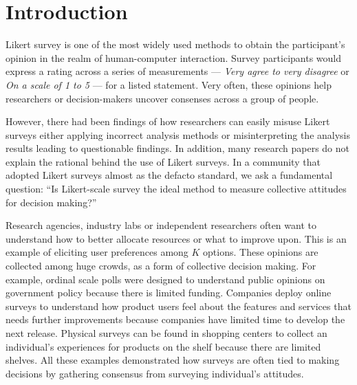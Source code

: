 \section{Introduction}
Likert survey 
is one of the most widely used methods
to obtain the participant's opinion
in the realm of human-computer interaction.
Survey participants would express
a rating across a series of measurements ---
\textit{Very agree to very disagree} or
\textit{On a scale of 1 to 5} ---
for a listed statement.
Very often, 
these opinions help
researchers or decision-makers
uncover consenses 
across a group of people.

However, there had been findings of
how researchers can 
easily misuse Likert surveys
either applying incorrect analysis methods 
\cite{bishop2015use}
or misinterpreting the analysis results
\cite{jamieson2004likert, pell2005use}
leading to questionable findings.
In addition, 
many research papers
do not explain the rational
behind the use of 
Likert surveys.
In a community that adopted Likert surveys
almost as the defacto standard,
we ask a fundamental question: 
``Is Likert-scale survey the ideal method
to measure collective attitudes for decision making?''

Research agencies, industry labs or independent researchers
often want to understand how to better allocate resources
or what to improve upon.
This is an example of eliciting user preferences 
among $K$ options.
These opinions are collected among huge crowds,
as a form of collective decision making.
For example, 
ordinal scale polls were designed
to understand public opinions
on government policy \cite{pew}
because there is limited funding.
Companies deploy online surveys 
to understand how product users 
feel about the features and services
that needs further improvements
because companies have limited time 
to develop the next release.
Physical surveys can be found 
in shopping centers 
to collect an individual's experiences
for products on the shelf
because there are limited shelves.
All these examples demonstrated
how surveys are often tied to 
making decisions 
by gathering consensus
from surveying individual's attitudes.

